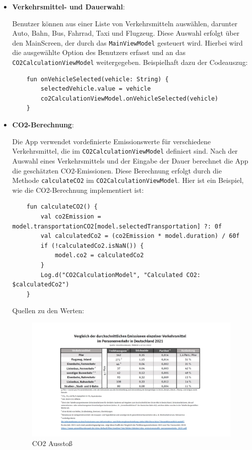 \documentclass{article}
\begin{document}
\begin{itemize}
    \item \textbf{Verkehrsmittel- und Dauerwahl}:
    
    Benutzer können aus einer Liste von Verkehrsmitteln auswählen, darunter Auto, Bahn, Bus, Fahrrad, Taxi und Flugzeug. Diese Auswahl erfolgt über den MainScreen, der durch das \texttt{MainViewModel} gesteuert wird. Hierbei wird die ausgewählte Option des Benutzers erfasst und an das \texttt{CO2CalculationViewModel} weitergegeben. Beispielhaft dazu der Codeauszug:
    
    \begin{lstlisting}
    fun onVehicleSelected(vehicle: String) {
        selectedVehicle.value = vehicle
        co2CalculationViewModel.onVehicleSelected(vehicle)
    }
    \end{lstlisting}

    \item \textbf{CO2-Berechnung}:
    
    Die App verwendet vordefinierte Emissionswerte für verschiedene Verkehrsmittel, die im \texttt{CO2CalculationViewModel} definiert sind. Nach der Auswahl eines Verkehrsmittels und der Eingabe der Dauer berechnet die App die geschätzten CO2-Emissionen. Diese Berechnung erfolgt durch die Methode \texttt{calculateCO2} im \texttt{CO2CalculationViewModel}. Hier ist ein Beispiel, wie die CO2-Berechnung implementiert ist:
    
    \begin{lstlisting}
    fun calculateCO2() {
        val co2Emission = model.transportationCO2[model.selectedTransportation] ?: 0f
        val calculatedCo2 = (co2Emission * model.duration) / 60f
        if (!calculatedCo2.isNaN()) {
            model.co2 = calculatedCo2
        }
        Log.d("CO2CalculationModel", "Calculated CO2: $calculatedCo2")
    }
    \end{lstlisting}
    Quellen zu den Werten:
   
    
\begin{figure}
   \includegraphics[width=1.00\textwidth]{uba_emissionstabelle_personenverkehr_2021_0}
   \caption{CO2 Ausstoß}
\end{figure}


\end{itemize}
\end{document}
